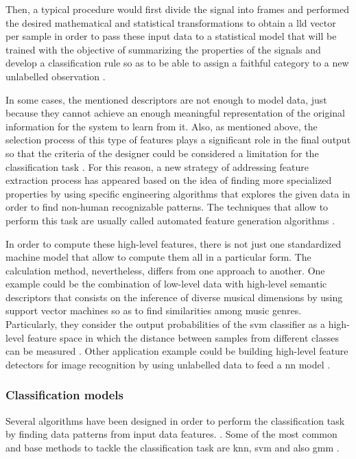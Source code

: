 	Then, a typical procedure would first divide the signal into frames and performed the desired mathematical and statistical transformations to obtain a \acrshort{lld} vector per sample in order to pass these input data to a statistical model that will be trained with the objective of summarizing the properties of the signals and develop a classification rule so as to be able to assign a faithful category to a new unlabelled observation \cite{Stowell2015}.
	
	In some cases, the mentioned descriptors are not enough to model data, just because they cannot achieve an enough meaningful representation of the original information for the system to learn from it. Also, as mentioned above, the selection process of this type of features plays a significant role in the final output so that the criteria of the designer could be considered a limitation for the classification task \cite{Grill2012}. For this reason, a new strategy of addressing feature extraction process has appeared based on the idea of finding more specialized properties by using specific engineering algorithms that explores the given data in order to find non-human recognizable patterns. The techniques that allow to perform this task are usually called automated feature generation algorithms \cite{Pachet2009}.
	
	In order to compute these high-level features, there is not just one standardized machine model that allow to compute them all in a particular form. The calculation method, nevertheless, differs from one approach to another. One example could be the combination of low-level data with high-level semantic descriptors that consists on the inference of diverse musical dimensions by using support vector machines so as to find similarities among music genres. Particularly, they consider the output probabilities of the \acrshort{svm} classifier as a high-level feature space in which the distance between samples from different classes can be measured \cite{Bogdanov2011}. Other application example could be building high-level feature detectors for image recognition by using unlabelled data to feed a \acrshort{nn} model \cite{Le2013}. 
	
\subsubsection{Classification models}
	
	Several algorithms have been designed in order to perform the classification task by finding data patterns from input data features. . Some of the most common and base methods to tackle the classification task are \acrshort{knn}, \acrshort{svm} and also \acrshort{gmm} \cite{Fu2011}.
	
